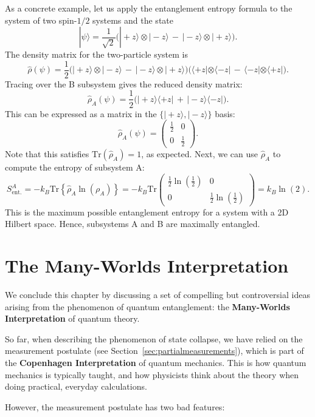 \documentclass[pra,11pt]{revtex4}
\begin{document}
As a concrete example, let us apply the entanglement entropy formula
to the system of two spin-$1/2$ systems and the state
$$|\psi\rangle = \frac{1}{\sqrt{2}} \Big(|\!+\!z\rangle\otimes|\!-\!z\rangle \,-\, |\!-\!z\rangle\otimes|\!+\!z\rangle\Big).$$
The density matrix for the two-particle system is
$$\hat{\rho}(\psi) = \frac{1}{2} \Big(|\!+\!z\rangle\otimes|\!-\!z\rangle \,-\, |\!-\!z\rangle\otimes|\!+\!z\rangle\Big) \Big(\langle+z|\otimes\langle-z| \,-\, \langle-z|\otimes\langle+z|\Big).$$
Tracing over the B subsystem gives the reduced density matrix:
$$\hat{\rho}_A(\psi) = \frac{1}{2} \Big(|\!+\!z\rangle \langle+z| \,+\, |\!-\!z\rangle \langle-z|\Big).$$
This can be expressed as a matrix in the
$\{|\!+z\rangle,|\!-z\rangle\}$ basis:
$$\hat{\rho}_A(\psi) = \begin{pmatrix}\frac{1}{2} & 0 \\ 0 & \frac{1}{2}\end{pmatrix}.$$
Note that this satisfies $\mathrm{Tr}(\hat\rho_A) = 1$, as expected.
Next, we can use $\hat{\rho}_A$ to compute the entropy of subsystem A:
$$S_{\mathrm{ent.}}^A = -k_B\mathrm{Tr}\left\{\hat{\rho}_A\ln(\rho_A)\right\} = -k_B\mathrm{Tr}\begin{pmatrix}\frac{1}{2}\ln\left(\frac{1}{2}\right) & 0 \\ 0 & \frac{1}{2}\ln\left(\frac{1}{2}\right)\end{pmatrix} = k_B\ln(2).$$
This is the maximum possible entanglement entropy for a system with a
2D Hilbert space.  Hence, subsystems A and B are maximally entangled.

\section{The Many-Worlds Interpretation}

We conclude this chapter by discussing a set of compelling but
controversial ideas arising from the phenomenon of quantum
entanglement: the \textbf{Many-Worlds Interpretation} of quantum
theory.

So far, when describing the phenomenon of state collapse, we have
relied on the measurement postulate (see
Section~\ref{sec:partialmeasurements}), which is part of the
\textbf{Copenhagen Interpretation} of quantum mechanics.  This is how
quantum mechanics is typically taught, and how physicists think about
the theory when doing practical, everyday calculations.

However, the measurement postulate has two bad features:
\end{document}
